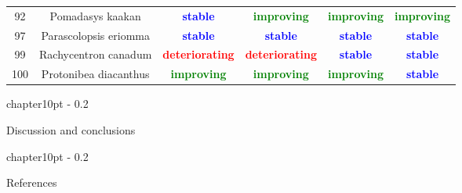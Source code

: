 \documentclass{report}\usepackage[]{graphicx}\usepackage[]{color}
\makeatletter
\renewcommand\chapter{\@startsection%
{chapter}{1}{0pt}%
{-\baselineskip}%
{0.2\baselineskip}%
{\raggedright\bf}}%
\makeatother
\begin{document}
\begin{table}[ht]
{\begin{tabular}{cccccc}
   92 & Pomadasys kaakan & \textcolor{blue}{\textbf{stable}} & \textcolor{green}{\textbf{improving}} & \textcolor{green}{\textbf{improving}} & \textcolor{green}{\textbf{improving}} \\ 
   97 & Parascolopsis eriomma & \textcolor{blue}{\textbf{stable}} & \textcolor{blue}{\textbf{stable}} & \textcolor{blue}{\textbf{stable}} & \textcolor{blue}{\textbf{stable}} \\ 
   99 & Rachycentron canadum & \textcolor{red}{\textbf{deteriorating}} & \textcolor{red}{\textbf{deteriorating}} & \textcolor{blue}{\textbf{stable}} & \textcolor{blue}{\textbf{stable}} \\ 
  100 & Protonibea diacanthus & \textcolor{green}{\textbf{improving}} & \textcolor{green}{\textbf{improving}} & \textcolor{green}{\textbf{improving}} & \textcolor{blue}{\textbf{stable}} \\ 
   \hline
\end{tabular}
}
\end{table}

\clearpage
\newpage

\chapter{Discussion and conclusions}


\newpage

\chapter{References}

\end{document}
